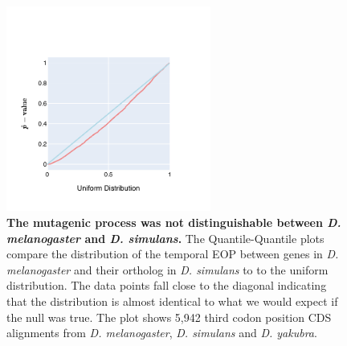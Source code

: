 \begin{figure}[ht!]
\centering
\includegraphics[width=0.6\textwidth]{figures/plots/drosophila/temp-EOP-QQ.pdf}
\caption[The mutagenic process was not distinguishable between \textit{D. melanogaster} and \textit{D. simulans}]{\textbf{The mutagenic process was not distinguishable between \textit{D. melanogaster} and \textit{D. simulans}.} The Quantile-Quantile plots compare the distribution of the temporal EOP between genes in \textit{D. melanogaster} and their ortholog in \textit{D. simulans} to  to the uniform distribution. The data points fall close to the diagonal indicating that the distribution is almost identical to what we would expect if the null was true. The plot shows 5,942 third codon position CDS alignments from \textit{D. melanogaster}, \textit{D. simulans} and \textit{D. yakubra}. }
\label{fig:drosophila:temp-EOP-qq}
\end{figure}

